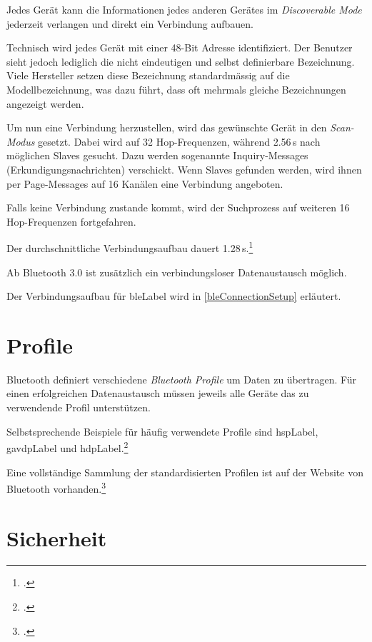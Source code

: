 Jedes Gerät kann die Informationen jedes anderen Gerätes im \textit{Discoverable Mode} jederzeit verlangen und direkt ein Verbindung aufbauen.

Technisch wird jedes Gerät mit einer 48-Bit Adresse identifiziert. Der Benutzer sieht jedoch lediglich die nicht eindeutigen und selbst definierbare Bezeichnung. Viele Hersteller setzen diese Bezeichnung standardmässig auf die Modellbezeichnung, was dazu führt, dass oft mehrmals gleiche Bezeichnungen angezeigt werden.

Um nun eine Verbindung herzustellen, wird das gewünschte Gerät in den \textit{Scan-Modus} gesetzt.
Dabei wird auf 32 Hop-Frequenzen, während 2.56\,s nach möglichen Slaves gesucht. Dazu werden sogenannte Inquiry-Messages (Erkundigungsnachrichten) verschickt.
Wenn Slaves gefunden werden, wird ihnen per Page-Messages auf 16 Kanälen eine Verbindung angeboten.

Falls keine Verbindung zustande kommt, wird der Suchprozess auf weiteren 16 Hop-Frequenzen fortgefahren.

Der durchschnittliche Verbindungsaufbau dauert 1.28\,s.\footcite{Bluetooth_de_Wikipedia_2015-04-18}

Ab Bluetooth 3.0 ist zusätzlich ein verbindungsloser Datenaustausch möglich.

Der Verbindungsaufbau für \gls{bleLabel} wird in \cref{bleConnectionSetup} erläutert.

\section{Profile}
Bluetooth definiert verschiedene \textit{Bluetooth Profile} um Daten zu übertragen.
Für einen erfolgreichen Datenaustausch müssen jeweils alle Geräte das zu verwendende Profil unterstützen.

Selbstsprechende Beispiele für häufig verwendete Profile sind \gls{hspLabel}, \gls{gavdpLabel} und  \gls{hdpLabel}.\footcite{List_of_Bluetooth_profiles_Wikipedia_2015-04-27}

Eine vollständige Sammlung der standardisierten Profilen ist auf der Website von Bluetooth vorhanden.\footcite{Profiles_Overview_Bluetooth_Development_Portal_2015-04-27}


\section{Sicherheit}

